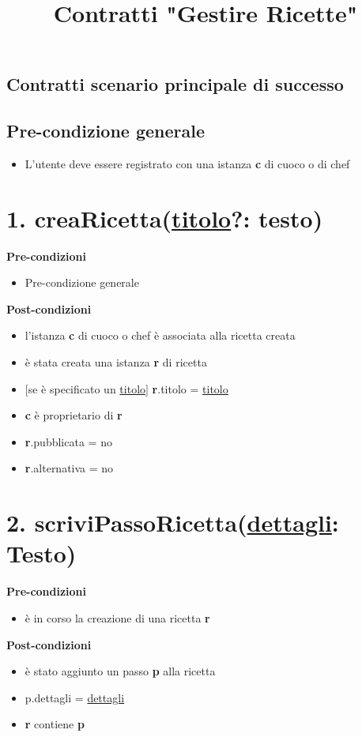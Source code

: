 \documentclass[12pt]{extarticle}
\begin{document}
\title{Contratti "Gestire Ricette"}
\date{}
\maketitle

\begin{center}
  \section*{Contratti scenario principale di successo}
\end{center}

\subsection*{Pre-condizione generale}
\begin{itemize}
  \item L'utente deve essere registrato con una istanza \textbf{c} di cuoco o di chef
\end{itemize}

\section*{1. creaRicetta(\underline{titolo}?: testo)}
\textbf{Pre-condizioni}
\begin{itemize}
  \item Pre-condizione generale
\end{itemize}
\textbf{Post-condizioni}
\begin{itemize}
  \item l'istanza \textbf{c} di cuoco o chef è associata alla ricetta creata
  \item è stata creata una istanza \textbf{r} di ricetta
  \item $[$se è specificato un \underline{titolo}$]$ \textbf{r}.titolo = \underline{titolo}
  \item \textbf{c} è proprietario di \textbf{r}
  \item \textbf{r}.pubblicata = no
  \item \textbf{r}.alternativa = no
\end{itemize}

\section*{2. scriviPassoRicetta(\underline{dettagli}: Testo)}

\textbf{Pre-condizioni} 	
\begin{itemize}
  \item è in corso la creazione di una ricetta  \textbf{r}
\end{itemize}
\textbf{Post-condizioni}
\begin{itemize}
  \item è stato aggiunto un passo  \textbf{p} alla ricetta
  \item p.dettagli = \underline{dettagli}
  \item  \textbf{r} contiene  \textbf{p}
\end{itemize}
\end{document}
